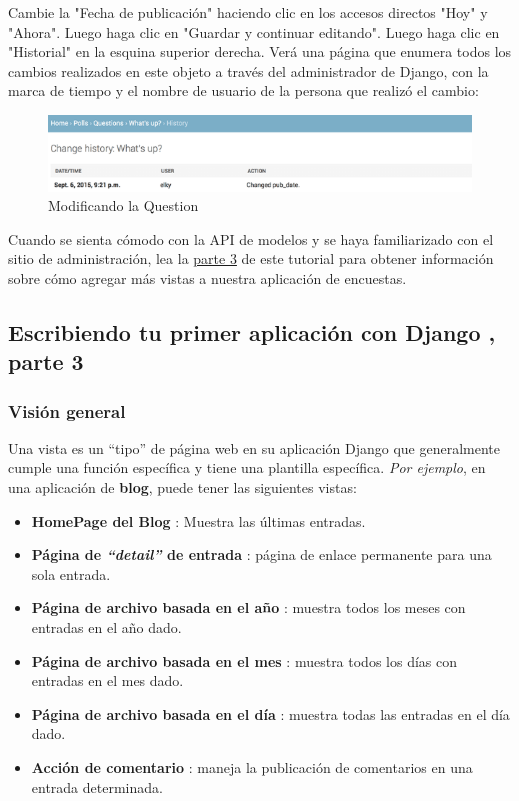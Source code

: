\documentclass[10pt]{article}
\newcommand{\django}[1]{{\textcolor{G}{Django} #1}}
\begin{document}
Cambie la "Fecha de publicación" haciendo clic en los accesos directos "Hoy" y "Ahora". Luego haga clic en "Guardar y continuar editando". Luego haga clic en "Historial" en la esquina superior derecha. Verá una página que enumera todos los cambios realizados en este objeto a través del administrador de Django, con la marca de tiempo y el nombre de usuario de la persona que realizó el cambio:

\begin{figure}[H]
\begin{center}
\includegraphics[scale=0.9]{figuras/3/32/325/img7.png}
\caption{Modificando la Question}
\end{center}
\end{figure}

Cuando se sienta cómodo con la API de modelos y se haya familiarizado con el sitio de administración, lea la {\href{https://docs.djangoproject.com/en/3.0/intro/tutorial03/}{\textcolor{B}{parte 3}}}  de este tutorial para obtener información sobre cómo agregar más vistas a nuestra aplicación de encuestas.

\subsection{Escribiendo tu primer aplicación con \django{}, parte 3}
\subsubsection{Visión general}

Una vista es un ``tipo'' de página web en su aplicación \django{} que generalmente cumple una función específica y tiene una plantilla específica. \textit{Por ejemplo}, en una aplicación de \textbf{blog}, puede tener las siguientes vistas:

\begin{itemize}
\item 
\textbf{HomePage del Blog} : 
Muestra las últimas entradas.

\item 
\textbf{Página de \textit{``detail''} de entrada} : página de enlace permanente para una sola entrada.

\item
\textbf{Página de archivo basada en el año} : muestra todos los meses con entradas en el año dado.
\item
\textbf{Página de archivo basada en el mes} : muestra todos los días con entradas en el mes dado.

\item
\textbf{Página de archivo basada en el día} : muestra todas las entradas en el día dado.

\item 
\textbf{Acción de comentario} : maneja la publicación de comentarios en una entrada determinada.
\end{itemize}
\end{document}
